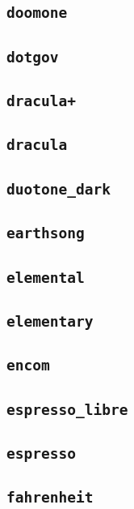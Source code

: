 \subsection{\texttt{doomone}}
\newpage
\subsection{\texttt{dotgov}}
\newpage
\subsection{\texttt{dracula+}}
\newpage
\subsection{\texttt{dracula}}
\newpage
\subsection{\texttt{duotone\_dark}}
\newpage
\subsection{\texttt{earthsong}}
\newpage
\subsection{\texttt{elemental}}
\newpage
\subsection{\texttt{elementary}}
\newpage
\subsection{\texttt{encom}}
\newpage
\subsection{\texttt{espresso\_libre}}
\newpage
\subsection{\texttt{espresso}}
\newpage
\subsection{\texttt{fahrenheit}}
\newpage
